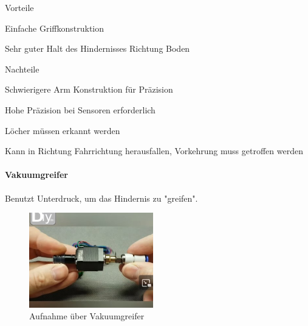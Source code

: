 \documentclass[../main.tex]{subfiles}
\begin{document}
\begin{minipage}[t]{0.48\textwidth}
    \begin{items}
          \item [Vorteile]
          \item Einfache Griffkonstruktion
          \item Sehr guter Halt des Hindernisses Richtung Boden
    \end{items}
\end{minipage}
\hfill
\begin{minipage}[t]{0.48\textwidth}
    \begin{items}
          \item [Nachteile]
          \item Schwierigere Arm Konstruktion für Präzision
          \item Hohe Präzision bei Sensoren erforderlich
          \item Löcher müssen erkannt werden
          \item Kann in Richtung Fahrrichtung herausfallen, Vorkehrung muss getroffen werden
    \end{items}
\end{minipage}
\newpage
\paragraph{Vakuumgreifer}
Benutzt Unterdruck, um das Hindernis zu "greifen".

\begin{figure}[h!]
        \centering
        \includegraphics[width=0.48\textwidth]{img/technologierecherche/Aufnahme/Vakuumgreifer.jpg}
        \caption[Aufnahme über Vakuumgreifer]{Aufnahme über Vakuumgreifer \footnotemark}
        \label{img:tech_Vakuumgreifer}
\end{figure}
\end{document}
